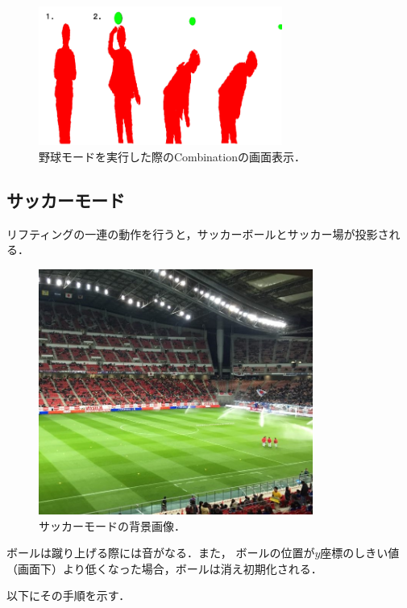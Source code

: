 \vspace{1cm}
\begin{figure}[h]
    \centering
    \includegraphics[width=8cm]{image/baseball.png}
    \caption[野球モードを実行した際のCombinationの画面表示]{野球モードを実行した際のCombinationの画面表示．}
  \label{baseball}
\end{figure}
\vspace{1cm}

\clearpage

\subsection{サッカーモード}
リフティングの一連の動作を行うと，サッカーボールとサッカー場が投影される．
\vspace{1cm}
\begin{figure}[h]
    \centering
    \includegraphics[width=9cm]{image/soccer_back.jpg}
    \caption[サッカーモードの背景画像]{サッカーモードの背景画像．}
  \label{kinect}
\end{figure}
\vspace{1cm}

ボールは蹴り上げる際には音がなる．また，
ボールの位置が$y$座標のしきい値（画面下）より低くなった場合，ボールは消え初期化される．

以下にその手順を示す．


